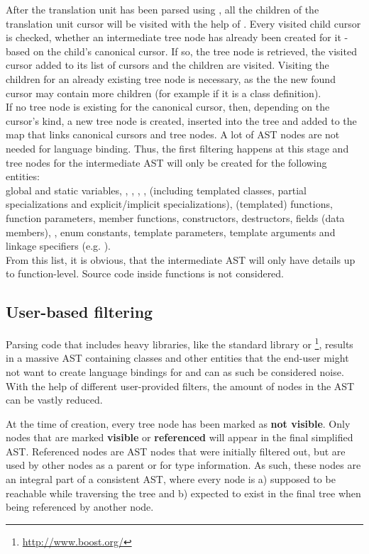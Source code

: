 After the translation unit has been parsed using , all the children of the translation unit cursor will be visited with the help of \linebreak{}. Every visited child cursor is checked, whether an intermediate tree node has already been created for it - based on the child's canonical cursor. If so, the tree node is retrieved, the visited cursor added to its list of cursors and the children are visited. Visiting the children for an already existing tree node is necessary, as the the new found cursor may contain more children (for example if it is a class definition).\\
If no tree node is existing for the canonical cursor, then, depending on the cursor's kind, a new tree node is created, inserted into the tree and added to the map that links canonical cursors and tree nodes. A lot of AST nodes are not needed for language binding. Thus, the first filtering happens at this stage and tree nodes for the intermediate AST will only be created for the following  entities:\\global and static variables, , , , ,  (including templated classes, partial specializations and explicit/implicit specializations), (templated) functions, function parameters, member functions, constructors, destructors, fields (data members), , enum constants, template parameters, template arguments and linkage specifiers (e.g. ).\\
From this list, it is obvious, that the intermediate AST will only have details up to function-level. Source code inside functions is not considered. 

\subsection{User-based filtering}

Parsing code that includes heavy libraries, like the  standard library or \footnote{\url{http://www.boost.org/}}, results in a massive AST containing classes and other entities that the end-user might not want to create language bindings for and can as such be considered noise. With the help of different user-provided filters, the amount of nodes in the AST can be vastly reduced. 

At the time of creation, every tree node has been marked as \textbf{not visible}. Only nodes that are marked \textbf{visible} or \textbf{referenced} will appear in the final simplified AST. Referenced nodes are AST nodes that were initially filtered out, but are used by other nodes as a parent or for type information. As such, these nodes are an integral part of a consistent AST, where every node is a) supposed to be reachable while traversing the tree and b) expected to exist in the final tree when being referenced by another node.

